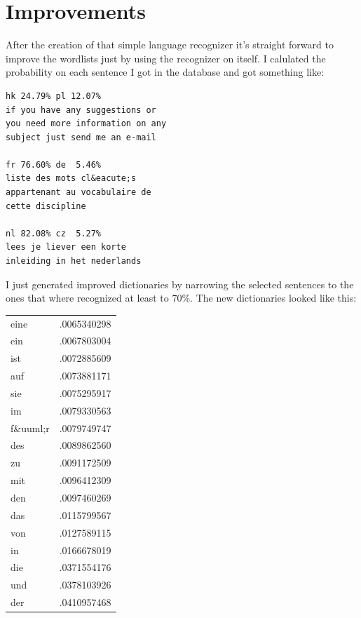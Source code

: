 \section{Improvements}
After the creation of that simple language recognizer it's straight forward to improve the wordlists just by using the recognizer on itself. I calulated the probability on each sentence I got in the database and got something like:
\begin{verbatim}
hk 24.79% pl 12.07% 
if you have any suggestions or
you need more information on any
subject just send me an e-mail

fr 76.60% de  5.46%
liste des mots cl&eacute;s 
appartenant au vocabulaire de 
cette discipline

nl 82.08% cz  5.27% 
lees je liever een korte 
inleiding in het nederlands
\end{verbatim}
I just generated improved dictionaries by narrowing the selected sentences to the ones that where recognized at least to 70\%. The new dictionaries looked like this:
 
\begin{center}
\begin{tabular}{lr}
eine     &.0065340298 \\
ein      &.0067803004 \\
ist      &.0072885609\\
auf      &.0073881171\\
sie      &.0075295917\\
im       &.0079330563\\
f\&uuml;r &.0079749747\\
des      &.0089862560\\
zu       &.0091172509\\
mit      &.0096412309\\
den      &.0097460269\\
das      &.0115799567\\
von      &.0127589115\\
in       &.0166678019\\
die      &.0371554176\\
und      &.0378103926\\
der      &.0410957468\\
\end{tabular}
\end{center}

